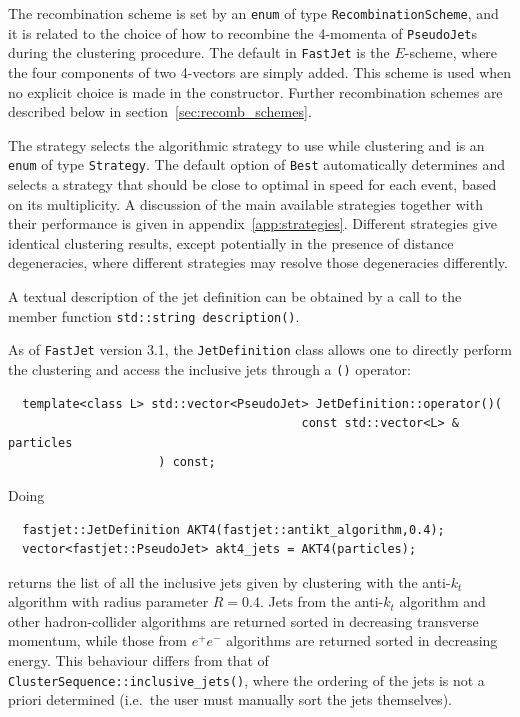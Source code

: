 \documentclass[12pt,a4]{article}
\newcommand{\fastjet}{\texttt{FastJet}\xspace}
\newcommand{\ttt}[1]{{\small\texttt{#1}}}
\begin{document}
The recombination scheme is set by an \ttt{enum} of type
\ttt{RecombinationScheme}, and it is related to the choice of how to
recombine the 4-momenta of \ttt{PseudoJet}s during the clustering procedure.
The default in \fastjet is the $E$-scheme, where the four components of
two 4-vectors are simply added.
%
This scheme is used when no explicit choice is made in the
constructor. 
%
Further recombination schemes are described below in
section~\ref{sec:recomb_schemes}.


The strategy selects the algorithmic strategy to use while clustering
and is an \ttt{enum} of type \ttt{Strategy}. The default option of
\ttt{Best} automatically determines and selects a strategy that
should be close to optimal in speed for each event, based on its
multiplicity. 
%
A discussion of the main available strategies together with their
performance is given in appendix~\ref{app:strategies}.
%
Different strategies give identical clustering results, except
potentially in the presence of distance degeneracies, where different
strategies may resolve those degeneracies differently.

A textual description of the jet definition can be obtained by a call
to the member function \ttt{std::string description()}.

As of \fastjet version 3.1, the \ttt{JetDefinition} class allows one
to directly perform the clustering and access the inclusive jets through
a \ttt{()} operator:
\begin{lstlisting}
  template<class L> std::vector<PseudoJet> JetDefinition::operator()(
                                         const std::vector<L> & particles
					 ) const;
\end{lstlisting}
Doing
\begin{lstlisting}
  fastjet::JetDefinition AKT4(fastjet::antikt_algorithm,0.4);
  vector<fastjet::PseudoJet> akt4_jets = AKT4(particles);
\end{lstlisting}
returns the list of all the inclusive jets given by clustering with
the anti-$k_t$ algorithm with radius parameter $R=0.4$.
%
Jets from the anti-$k_t$ algorithm and other hadron-collider
algorithms are returned sorted in decreasing transverse momentum,
while those from $e^+e^-$ algorithms are returned sorted in decreasing
energy.
%
This behaviour differs from that of
\ttt{ClusterSequence::inclusive\_jets()}, where the ordering of the
jets is not a priori determined (i.e.\ the user must manually sort the
jets themselves).

\end{document}
